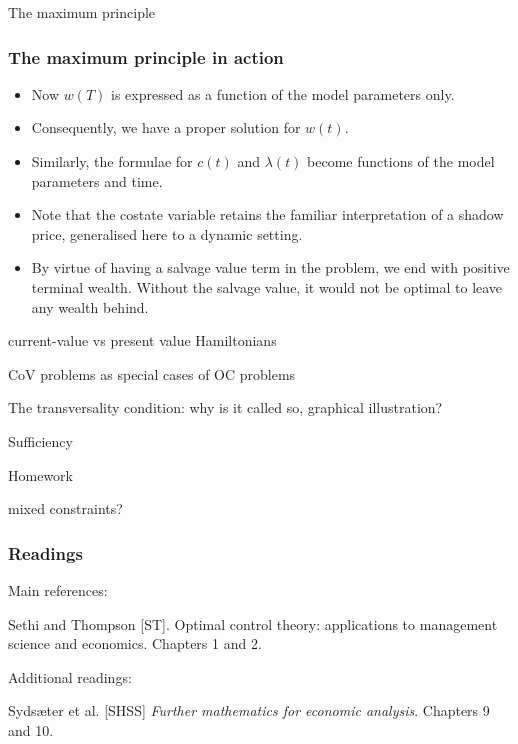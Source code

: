 \documentclass[10pt]{beamer}
\theoremstyle{definition}
\begin{document}
\begin{section}{The maximum principle}
\begin{frame}[fragile]
\frametitle{The maximum principle in action}
\addtocounter{theorem}{-1}
\begin{example}[cont.]
\begin{itemize}\itemsep1em
\item Now $ w(T) $ is expressed as a function of the model parameters only. 
\item Consequently, we have a proper solution for $ w(t) $.
\item Similarly, the formulae for $ c(t) $ and $ \lambda(t) $ become functions of the model parameters and time.
\item Note that the costate variable retains the familiar interpretation of a shadow price, generalised here to a dynamic setting.
\item By virtue of having a salvage value term in the problem, we end with positive terminal wealth. Without the salvage value, it would not be optimal to leave any wealth behind.
\end{itemize}

\end{example}
\end{frame}




















current-value vs present value Hamiltonians

CoV problems as special cases of OC problems

The transversality condition: why is it called so, graphical illustration?

Sufficiency

Homework

mixed constraints?



\end{section}
\begin{frame}[fragile]
\frametitle{Readings}
Main references:

Sethi and Thompson [ST]. Optimal control theory: applications to management science and economics. Chapters 1 and 2.\bigskip

Additional readings:

Syds\ae{}ter et al. [SHSS] \emph{Further mathematics for economic analysis}. Chapters 9 and 10.

\end{frame}
\end{document}
